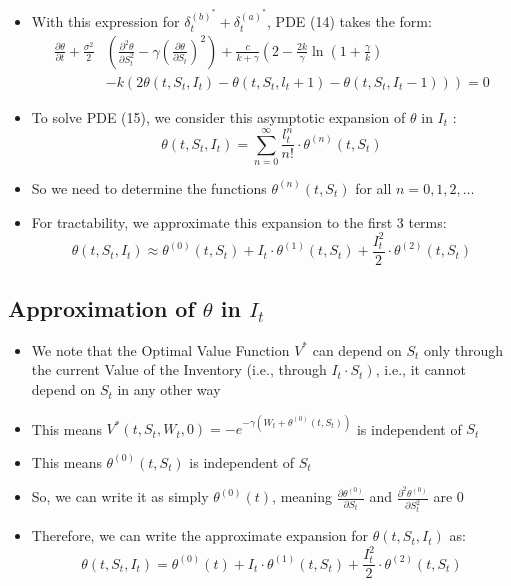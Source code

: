 \documentclass[10pt]{article}
\begin{document}
\begin{itemize} 
    \item With this expression for $\delta_{t}^{(b)^{*}}+\delta_{t}^{(a)^{*}}$, PDE (14) takes the form:
    \[
    \begin{aligned}
    \frac{\partial \theta}{\partial t}+\frac{\sigma^{2}}{2} &\left(\frac{\partial^{2} \theta}{\partial S_{t}^{2}}-\gamma\left(\frac{\partial \theta}{\partial S_{t}}\right)^{2}\right)+\frac{c}{k+\gamma}\left(2-\frac{2 k}{\gamma} \ln \left(1+\frac{\gamma}{k}\right)\right.\\
    &\left.-k\left(2 \theta\left(t, S_{t}, I_{t}\right)-\theta\left(t, S_{t}, l_{t}+1\right)-\theta\left(t, S_{t}, I_{t}-1\right)\right)\right)=0
    \end{aligned} \tag{15}
    \]
    \item To solve PDE (15), we consider this asymptotic expansion of $\theta$ in $I_{t}$ :
    $$
    \theta\left(t, S_{t}, I_{t}\right)=\sum_{n=0}^{\infty} \frac{l_{t}^{n}}{n !} \cdot \theta^{(n)}\left(t, S_{t}\right)
    $$
    \item So we need to determine the functions $\theta^{(n)}\left(t, S_{t}\right)$ for all $n=0,1,2, \ldots$
    \item For tractability, we approximate this expansion to the first 3 terms:
    $$
    \theta\left(t, S_{t}, I_{t}\right) \approx \theta^{(0)}\left(t, S_{t}\right)+I_{t} \cdot \theta^{(1)}\left(t, S_{t}\right)+\frac{I_{t}^{2}}{2} \cdot \theta^{(2)}\left(t, S_{t}\right)
    $$
\end{itemize}

\subsection{Approximation of $\theta$ in $I_{t}$}

\begin{itemize} 
    \item We note that the Optimal Value Function $V^{*}$ can depend on $S_{t}$ only through the current Value of the Inventory (i.e., through $\left.I_{t} \cdot S_{t}\right)$, i.e., it cannot depend on $S_{t}$ in any other way
    \item This means $V^{*}\left(t, S_{t}, W_{t}, 0\right)=-e^{-\gamma\left(W_{t}+\theta^{(0)}\left(t, S_{t}\right)\right)}$ is independent of $S_{t}$
    \item This means $\theta^{(0)}\left(t, S_{t}\right)$ is independent of $S_{t}$
    \item So, we can write it as simply $\theta^{(0)}(t)$, meaning $\frac{\partial \theta^{(0)}}{\partial S_{t}}$ and $\frac{\partial^{2} \theta^{(0)}}{\partial S_{t}^{2}}$ are 0
    \item Therefore, we can write the approximate expansion for $\theta\left(t, S_{t}, I_{t}\right)$ as:
    \[
    \theta\left(t, S_{t}, I_{t}\right)=\theta^{(0)}(t)+I_{t} \cdot \theta^{(1)}\left(t, S_{t}\right)+\frac{I_{t}^{2}}{2} \cdot \theta^{(2)}\left(t, S_{t}\right) \tag{16}
    \]
\end{itemize}
\end{document}
